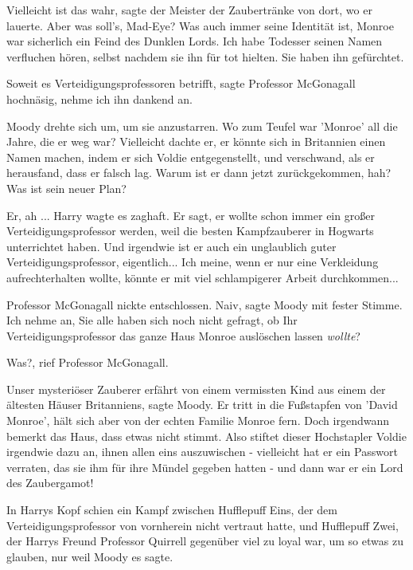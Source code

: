 \glqq{}Vielleicht ist das wahr\grqq{}, sagte der Meister der Zaubertränke von
dort, wo er lauerte. \glqq{}Aber was soll's, Mad-Eye? Was auch immer seine
Identität ist, Monroe war sicherlich ein Feind des Dunklen Lords. Ich habe
Todesser seinen Namen verfluchen hören, selbst nachdem sie ihn für tot hielten.
Sie haben ihn gefürchtet.\grqq{}

\glqq{}Soweit es Verteidigungsprofessoren betrifft\grqq{}, sagte Professor
McGonagall hochnäsig, \glqq{}nehme ich ihn dankend an.\grqq{}

Moody drehte sich um, um sie anzustarren. \glqq{}Wo zum Teufel war 'Monroe' all
die Jahre, die er weg war? Vielleicht dachte er, er könnte sich in Britannien
einen Namen machen, indem er sich Voldie entgegenstellt, und verschwand, als er
herausfand, dass er falsch lag. Warum ist er dann jetzt zurückgekommen, hah? Was
ist sein neuer Plan?\grqq{}

\glqq{}Er, ah ...\grqq{} Harry wagte es zaghaft. \glqq{}Er sagt, er wollte schon
immer ein großer Verteidigungsprofessor werden, weil die besten Kampfzauberer in
Hogwarts unterrichtet haben. Und irgendwie ist er auch ein unglaublich guter
Verteidigungsprofessor, eigentlich... Ich meine, wenn er nur eine Verkleidung
aufrechterhalten wollte, könnte er mit viel schlampigerer Arbeit
durchkommen...\grqq{}

Professor McGonagall nickte entschlossen. \glqq{}Naiv\grqq{}, sagte Moody mit
fester Stimme. \glqq{}Ich nehme an, Sie alle haben sich noch nicht gefragt, ob
Ihr Verteidigungsprofessor das ganze Haus Monroe auslöschen lassen
\emph{wollte}?\grqq{}

\glqq{}Was?\grqq{}, rief Professor McGonagall.

\glqq{}Unser mysteriöser Zauberer erfährt von einem vermissten Kind aus einem der
ältesten Häuser Britanniens\grqq{}, sagte Moody. \glqq{}Er tritt in die
Fußstapfen von 'David Monroe', hält sich aber von der echten Familie Monroe
fern. Doch irgendwann bemerkt das Haus, dass etwas nicht stimmt. Also stiftet
dieser Hochstapler Voldie irgendwie dazu an, ihnen allen eins auszuwischen -
vielleicht hat er ein Passwort verraten, das sie ihm für ihre Mündel gegeben
hatten - und dann war er ein Lord des Zaubergamot!\grqq{}

In Harrys Kopf schien ein Kampf zwischen Hufflepuff Eins, der dem
Verteidigungsprofessor von vornherein nicht vertraut hatte, und Hufflepuff Zwei,
der Harrys Freund Professor Quirrell gegenüber viel zu loyal war, um so etwas zu
glauben, nur weil Moody es sagte.

